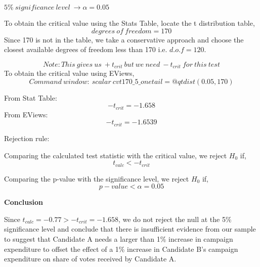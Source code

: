 \documentclass[12pt]{report}
\begin{document}
\noindent $5\%\ significance\ level\ \to \alpha = 0.05$

\noindent To obtain the critical value using the Stats Table, locate the t distribution table,
$$degrees\ of\ freedom = 170$$
\noindent Since 170 is not in the table, we take a conservative approach and choose the closest available degrees of freedom less than 170 i.e. $d.o.f=120$. 
\begin{figure}[H]
	\centering
\end{figure}
\vspace{-\baselineskip}
$$Note:This\ gives\ us\ +t_{crit}\ but\ we\ need\ -t_{crit}\ for\ this\ test$$
\noindent To obtain the critical value using EViews,
$$Command\ window:\ scalar\ cvt170\_5\_onetail=@qtdist(0.05,170)$$
\begin{figure}[H]
	\centering
\end{figure}
\vspace{-\baselineskip}
\begin{figure}[H]
	\centering

\end{figure}
\vspace{-\baselineskip}
\noindent From Stat Table:
$$-t_{crit} = -1.658$$
\noindent From EViews:
$$-t_{crit} = -1.6539$$

\noindent Rejection rule: 

\noindent Comparing the calculated test statistic with the critical value, we reject $H_0$ if,
$$t_{calc} < -t_{crit}$$

\noindent Comparing the p-value with the significance level, we reject $H_0$ if,
$$p-value < \alpha = 0.05$$

\newpage
\noindent \textbf{Conclusion}

\noindent Since $t_{calc} =-0.77 > -t_{crit} = -1.658$, we do not reject the null at the 5\% significance level and conclude that there is insufficient evidence from our sample to suggest that Candidate A needs a larger than 1\% increase in campaign expenditure to offset the effect of a 1\% increase in Candidate B’s campaign expenditure on share of votes received by Candidate A.
\end{document}
